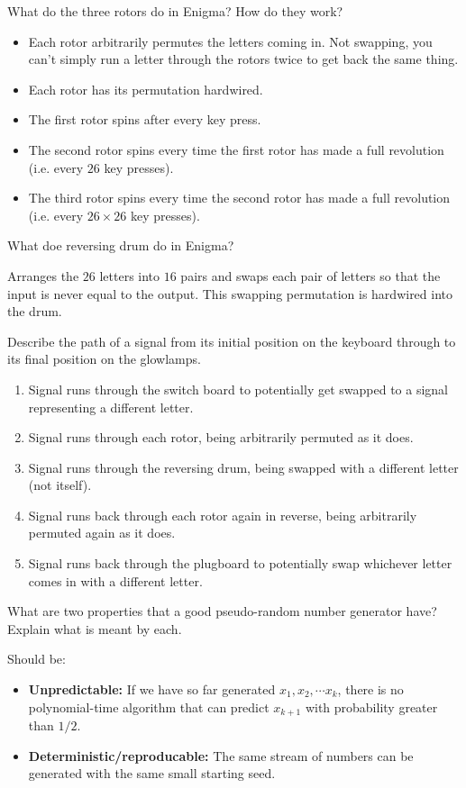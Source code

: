\documentclass{article}
\newcounter{qcounter}
\newcommand{\showqcounter}{\theqcounter}
\newcommand{\question}{\vspace{5mm}\addtocounter{qcounter}{1}\vspace{5mm}{\bf Q\showqcounter: }}
\newcommand{\answer}{\vspace{5mm}{\bf A\showqcounter: }}
\begin{document}
\question What do the three rotors do in Enigma? How do they work?

\answer
  \begin{itemize}
    \item Each rotor arbitrarily permutes the letters coming in. Not swapping, you can't simply run a letter through the rotors twice to get back the same thing.
    \item Each rotor has its permutation hardwired. 
    \item The first rotor spins after every key press.
    \item The second rotor spins every time the first rotor has made a full revolution (i.e. every $26$ key presses).
    \item The third rotor spins every time the second rotor has made a full revolution (i.e. every $26 \times 26$ key presses).
  \end{itemize}


\question What doe reversing drum do in Enigma?

\answer Arranges the $26$ letters into $16$ pairs and swaps each pair of letters so that the input is never equal to the output. 
  This swapping permutation is hardwired into the drum.


\question Describe the path of a signal from its initial position on the keyboard through to its final position on the glowlamps.

\answer
  \begin{enumerate}
    \item Signal runs through the switch board to potentially get swapped to a signal representing a different letter.
    \item Signal runs through each rotor, being arbitrarily permuted as it does.
    \item Signal runs through the reversing drum, being swapped with a different letter (not itself).
    \item Signal runs back through each rotor again in reverse, being arbitrarily permuted again as it does.
    \item Signal runs back through the plugboard to potentially swap whichever letter comes in with a different letter. 
  \end{enumerate}


\question What are two properties that a good pseudo-random number generator have? Explain what is meant by each.

\answer Should be:
  \begin{itemize}
    \item {\bf Unpredictable:} If we have so far generated $x_1, x_2, \cdots x_k$, there is no polynomial-time 
      algorithm that can predict $x_{k + 1}$ with probability greater than $1 / 2$.
    \item {\bf Deterministic/reproducable:} The same stream of numbers can be generated with the same small starting seed.
  \end{itemize}
\end{document}
